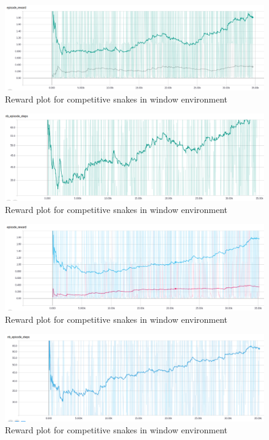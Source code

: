 \documentclass[conference,10pt]{IEEEtran}
\begin{document}
	\begin{figure}[]
		
		\includegraphics[width = \linewidth]{plot/snake_window_comp_reward.png}
		\caption{Reward plot for competitive  snakes in window environment}
		\label{rcmsw}
		
	\end{figure}
	\begin{figure}[]
		
		\includegraphics[width = \linewidth]{plot/snake_window_comp_step.png}
		\caption{Reward plot for competitive  snakes in window environment}
		\label{scmsw}
		
	\end{figure}\begin{figure}[]
	
	\includegraphics[width = \linewidth]{plot/snake_window_coop_reward.png}
	\caption{Reward plot for competitive  snakes in window environment}
	\label{rcosw}
	
\end{figure}\begin{figure}[]

\includegraphics[width = \linewidth]{plot/snake_window_coop_step.png}
\caption{Reward plot for competitive  snakes in window environment}
\label{scosw}

\end{figure}
\end{document}
